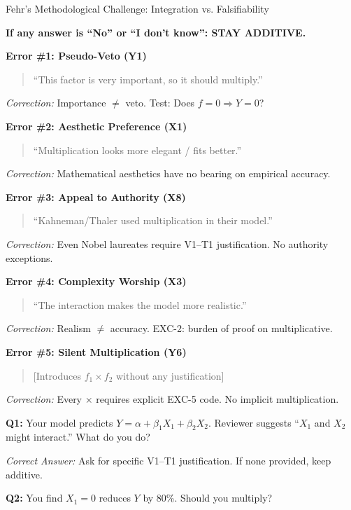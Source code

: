 \begin{chapter}{Fehr's Methodological Challenge: Integration vs. Falsifiability}
\begin{tcolorbox}[colback=orange!5!white,colframe=orange!75!black,title=\textbf{Pre-Modeling Checklist (MANDATORY)}]
\textbf{If any answer is ``No'' or ``I don't know'': STAY ADDITIVE.}
\end{tcolorbox}

\begin{tcolorbox}[colback=red!5!white,colframe=red!75!black,title=\textbf{Common Training Errors (Red Flags)}]
\textbf{Error \#1: Pseudo-Veto (Y1)}
\begin{quote}
``This factor is very important, so it should multiply.''
\end{quote}
\textit{Correction:} Importance $\neq$ veto. Test: Does $f=0 \Rightarrow Y=0$?

\textbf{Error \#2: Aesthetic Preference (X1)}
\begin{quote}
``Multiplication looks more elegant / fits better.''
\end{quote}
\textit{Correction:} Mathematical aesthetics have no bearing on empirical accuracy.

\textbf{Error \#3: Appeal to Authority (X8)}
\begin{quote}
``Kahneman/Thaler used multiplication in their model.''
\end{quote}
\textit{Correction:} Even Nobel laureates require V1--T1 justification. No authority exceptions.

\textbf{Error \#4: Complexity Worship (X3)}
\begin{quote}
``The interaction makes the model more realistic.''
\end{quote}
\textit{Correction:} Realism $\neq$ accuracy. EXC-2: burden of proof on multiplicative.

\textbf{Error \#5: Silent Multiplication (Y6)}
\begin{quote}
[Introduces $f_1 \times f_2$ without any justification]
\end{quote}
\textit{Correction:} Every $\times$ requires explicit EXC-5 code. No implicit multiplication.
\end{tcolorbox}

\begin{tcolorbox}[colback=blue!5!white,colframe=blue!75!black,title=\textbf{Self-Assessment Quiz}]
\textbf{Q1:} Your model predicts $Y = \alpha + \beta_1 X_1 + \beta_2 X_2$. Reviewer suggests ``$X_1$ and $X_2$ might interact.'' What do you do?

\textit{Correct Answer:} Ask for specific V1--T1 justification. If none provided, keep additive.

\vspace{0.3cm}
\textbf{Q2:} You find $X_1 = 0$ reduces $Y$ by 80\%. Should you multiply?


\end{tcolorbox}
\end{chapter}
